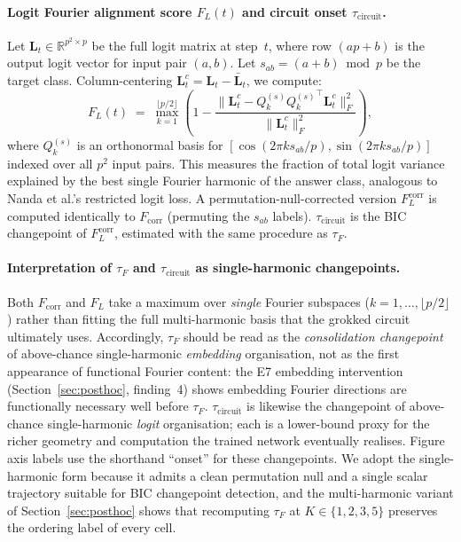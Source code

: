 \documentclass{article}
\newcommand{\tauf}{\tau_{F}}
\newcommand{\taucirc}{\tau_{\mathrm{circuit}}}
\newcommand{\fcorr}{F_{\mathrm{corr}}}
\newcommand{\flogit}{F_{L}}
\begin{document}
\paragraph{Logit Fourier alignment score $\flogit(t)$ and circuit onset $\taucirc$.}
Let $\mathbf{L}_t\!\in\!\mathbb{R}^{p^2\times p}$ be the full logit matrix
at step~$t$, where row $(ap+b)$ is the output logit vector for input
pair $(a,b)$.
Let $s_{ab}=(a+b)\bmod p$ be the target class.
Column-centering $\mathbf{L}_t^c = \mathbf{L}_t - \bar{\mathbf{L}}_t$,
we compute:
\begin{equation}
  \flogit(t) \;=\; \max_{k=1}^{\lfloor p/2\rfloor}
  \!\left(1 - \frac{\|\mathbf{L}_t^c - Q_k^{(s)} {Q_k^{(s)}}^\top
  \mathbf{L}_t^c\|_F^2}{\|\mathbf{L}_t^c\|_F^2}\right),
  \label{eq:f_logit}
\end{equation}
where $Q_k^{(s)}$ is an orthonormal basis for
$[\cos(2\pi k s_{ab}/p),\sin(2\pi k s_{ab}/p)]$ indexed over all
$p^2$ input pairs.
This measures the fraction of total logit variance explained by the
best single Fourier harmonic of the answer class, analogous to
Nanda et al.'s restricted logit loss.
A permutation-null-corrected version $\flogit^{\mathrm{corr}}$ is
computed identically to $\fcorr$ (permuting the $s_{ab}$ labels).
$\taucirc$ is the BIC changepoint of $\flogit^{\mathrm{corr}}$,
estimated with the same procedure as $\tauf$.

\paragraph{Interpretation of $\tauf$ and $\taucirc$ as single-harmonic
changepoints.}
Both $\fcorr$ and $\flogit$ take a maximum over \emph{single} Fourier
subspaces ($k=1,\dots,\lfloor p/2\rfloor$) rather than fitting the
full multi-harmonic basis that the grokked circuit ultimately uses.
Accordingly, $\tauf$ should be read as the \emph{consolidation
changepoint} of above-chance
single-harmonic \emph{embedding} organisation, not as the first
appearance of functional Fourier content: the E7 embedding
intervention (Section~\ref{sec:posthoc}, finding~4) shows embedding
Fourier directions are functionally necessary well before $\tauf$.
$\taucirc$ is likewise the changepoint of above-chance
single-harmonic \emph{logit} organisation; each
is a lower-bound proxy for the richer geometry and computation the
trained network eventually realises.
Figure axis labels use the shorthand ``onset'' for these
changepoints.
We adopt the single-harmonic form because it admits a clean
permutation null and a single scalar trajectory suitable for BIC
changepoint detection, and the multi-harmonic variant of
Section~\ref{sec:posthoc} shows that recomputing $\tauf$ at
$K\in\{1,2,3,5\}$ preserves the ordering label of every cell.
\end{document}
